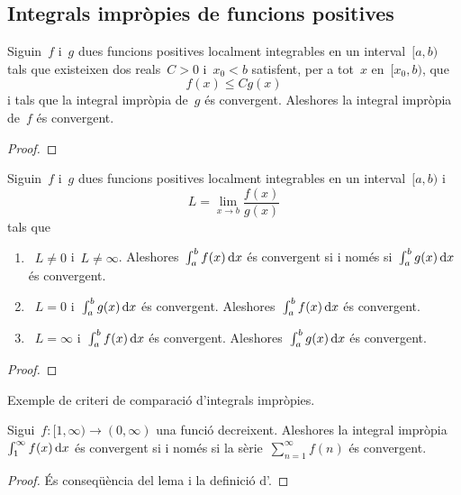 \documentclass[../../Main.tex]{subfiles}
\begin{document}
	\subsection{Integrals impròpies de funcions positives}
	\begin{lemma}
		\label{lema:criteri de comparació d'integrals impròpies}
		Siguin~\(f\) i~\(g\) dues funcions positives localment integrables en un interval~\([a,b)\) tals que existeixen dos reals~\(C>0\) i~\(x_{0}<b\) satisfent, per a tot~\(x\) en~\([x_{0},b)\), que
		\[
		    f(x)\leq Cg(x)
		\]
		i tals que la integral impròpia de~\(g\) és convergent.
		Aleshores la integral impròpia de~\(f\) és convergent.
		\begin{proof}
		\end{proof}
	\end{lemma}
	\begin{theorem}
		\label{def:criteri de comapració d'integrals impròpies}
		Siguin~\(f\) i~\(g\) dues funcions positives localment integrables en un interval~\([a,b)\) i
		\[
		    L=\lim_{x\to b}\frac{f(x)}{g(x)}
		\]
		tals que
		\begin{enumerate}
			\item\label{def:criteri de comapració d'integrals impròpies:eq1}~\(L\neq0\) i~\(L\neq\infty\).
			Aleshores~\(\int_{a}^{b}f(x)\mathop{}\!\mathrm{d} x\) és convergent si i només si~\(\int_{a}^{b}g(x)\mathop{}\!\mathrm{d} x\) és convergent.
			\item\label{def:criteri de comapració d'integrals impròpies:eq2}~\(L=0\) i~\(\int_{a}^{b}g(x)\mathop{}\!\mathrm{d} x\) és convergent.
			Aleshores~\(\int_{a}^{b}f(x)\mathop{}\!\mathrm{d} x\) és convergent.
			\item\label{def:criteri de comapració d'integrals impròpies:eq3}~\(L=\infty\) i~\(\int_{a}^{b}f(x)\mathop{}\!\mathrm{d} x\) és convergent.
			Aleshores~\(\int_{a}^{b}g(x)\mathop{}\!\mathrm{d} x\) és convergent.
		\end{enumerate}
		\begin{proof}
		\end{proof}
	\end{theorem}
	\begin{example}
		\label{ex:criteri de comapració d'integrals impròpies}
		Exemple de criteri de comparació d'integrals impròpies.
		\begin{solution}
		\end{solution}
	\end{example}
	\begin{theorem}
		\label{thm:criteri de la integral per integrals impròpies}
		Sigui~\(f\colon[1,\infty)\longrightarrow(0,\infty)\) una funció decreixent.
		Aleshores la integral impròpia~\(\int_{1}^{\infty}f(x)\mathop{}\!\mathrm{d} x\) és convergent si i només si la sèrie~\(\sum_{n=1}^{\infty}f(n)\) és convergent.
		\begin{proof}
			És conseqüència del lema  i la definició d'.
		\end{proof}
	\end{theorem}
\end{document}
